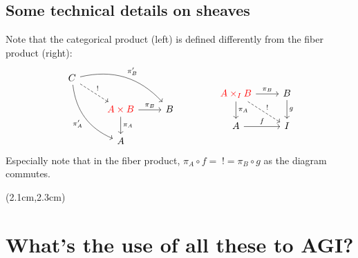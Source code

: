 \begin{preview}
\begin{minipage}{\textwidth}
\begin{itemize}
\end{itemize}


\subsection{Some technical details on sheaves}

Note that the categorical product (left) is defined differently from the fiber product (right):
\begin{equation}
\begin{tikzcd}
C \arrow[ddr,bend right,"\pi'_A"'] \arrow[drr,bend left,"\pi'_B"] \arrow[dr,dashed,"!"] \\
& {\color{red} A \times B} \arrow[r,"\pi_B"] \arrow[d,"\pi_A"] & B \\
& A & {}
\end{tikzcd}
\qquad \qquad
\begin{tikzcd}[]
{\color{red}A \times_I B} \arrow[r,"\pi_B"] \arrow[dr,dashed,"!"] \arrow[d,"\pi_A"] & B \arrow[d,"g"] \\
A \arrow[r,"f"] & I
\end{tikzcd}
\end{equation}
Especially note that in the fiber product, $ \pi_A \circ f = \; ! = \pi_B \circ g $ as the diagram commutes.  

\end{minipage}
\end{preview}

\begin{preview}
\begin{textblock*}{5cm}(2.1cm,2.3cm) %
	{\color{red}{\large \textcircled{\small \themypage}}}
	\addtocounter{mypage}{1}
\end{textblock*}
	
\begin{minipage}{\textwidth}
	\setlength{\parskip}{0.4\baselineskip}
		
\section{What's the use of all these to AGI?}

		
\end{minipage}
\end{preview}


